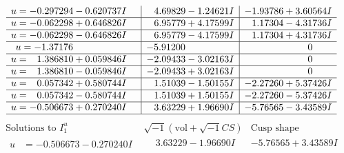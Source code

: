 \documentclass[1p]{elsarticle_modified}
\theoremstyle{definition}
\newcommand{\I}{\sqrt{-1}}
\begin{document}
$$\begin{array}{c|c|c}
\begin{aligned}
u &= -0.297294 - 0.620737 I\end{aligned}
 & \phantom{-}4.69829 - 1.24621 I & -1.93786 + 3.60564 I \\ \hline\begin{aligned}
u &= -0.062298 + 0.646826 I\end{aligned}
 & \phantom{-}6.95779 + 4.17599 I & \phantom{-}1.17304 - 4.31736 I \\ \hline\begin{aligned}
u &= -0.062298 - 0.646826 I\end{aligned}
 & \phantom{-}6.95779 - 4.17599 I & \phantom{-}1.17304 + 4.31736 I \\ \hline\begin{aligned}
u &= -1.37176\phantom{ +0.000000I}\end{aligned}
 & -5.91200\phantom{ +0.000000I} & \phantom{-0.000000 } 0 \\ \hline\begin{aligned}
u &= \phantom{-}1.386810 + 0.059846 I\end{aligned}
 & -2.09433 - 3.02163 I & \phantom{-0.000000 } 0 \\ \hline\begin{aligned}
u &= \phantom{-}1.386810 - 0.059846 I\end{aligned}
 & -2.09433 + 3.02163 I & \phantom{-0.000000 } 0 \\ \hline\begin{aligned}
u &= \phantom{-}0.057342 + 0.580744 I\end{aligned}
 & \phantom{-}1.51039 - 1.50155 I & -2.27260 + 5.37426 I \\ \hline\begin{aligned}
u &= \phantom{-}0.057342 - 0.580744 I\end{aligned}
 & \phantom{-}1.51039 + 1.50155 I & -2.27260 - 5.37426 I \\ \hline\begin{aligned}
u &= -0.506673 + 0.270240 I\end{aligned}
 & \phantom{-}3.63229 + 1.96690 I & -5.76565 - 3.43589 I\\
 \hline 
 \end{array}$$\newpage$$\begin{array}{c|c|c}  
\text{Solutions to }I^u_{1}& \I (\text{vol} + \sqrt{-1}CS) & \text{Cusp shape}\\
 \hline 
\begin{aligned}
u &= -0.506673 - 0.270240 I\end{aligned}
 & \phantom{-}3.63229 - 1.96690 I & -5.76565 + 3.43589 I \\ \hline\begin{aligned}

\end{aligned}
\end{array}$$
\end{document}
